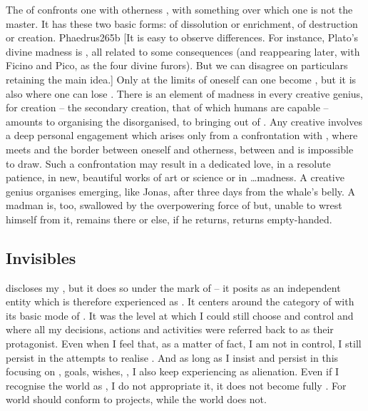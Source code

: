 The  of  confronts one with otherness
, with something over which one is not the master. It has these two
basic forms: of dissolution or enrichment, of destruction or creation.
\citet{And of madness there [are] two kinds; one produced by human infirmity,
  the other [is] a divine release of the soul from the yoke of custom and
  convention.}{Phaedrus}{265b [It is easy to observe differences.
  For instance, Plato's divine madness is , all related to some 
  consequences (and reappearing later, with Ficino and Pico, as
  the four divine furors). But we can disagree on particulars retaining the main
  idea.]} Only at the limits of {oneself} can one become , but it is
also where one can lose . There is an element of madness in every
creative genius, for creation -- the secondary creation, that of which
humans are capable -- amounts to organising the disorganised, to bringing
 out of .  Any creative  involves a deep
personal engagement which arises only from a confrontation with ,
where  meets  and the border between oneself and otherness,
between  and  is impossible to draw.  Such a confrontation
may result in a dedicated love, in a resolute patience, in new, beautiful works
of art or science or in \ldots madness.  A creative genius organises 
emerging, like Jonas, after three days from the whale's belly.  A madman is,
too, swallowed by the overpowering force of  but, unable to wrest
himself from it, remains there or else, if he returns, returns empty-handed.

\subsection{Invisibles}\label{sec:levelD}


\pa {} discloses my
, but it does so under the mark of 
 -- it posits  as an independent entity which is
therefore experienced as . It centers around the category of
 with its basic mode of .  It was the level at which I
could still choose and control and where all my decisions, actions and
activities were referred back to  as their protagonist. Even when I
feel that, as a matter of fact, I am not in control, I still persist in the
attempts to realise .  And as long as I insist and persist in this
focusing on ,  goals,  wishes, , I also
keep experiencing  as alienation. Even if I recognise the world
as , I do not appropriate it, it does not become fully .
For  world should conform to  projects, while the world does not.

